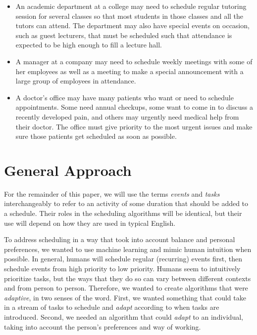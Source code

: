 \documentclass{article}
\newcommand{\todo}[1]{}
\begin{document}
\begin{itemize}
	\item 	
	 	An academic department at a college may need to schedule regular tutoring session for several classes so that most students in those classes and all the tutors can attend. The department may also have special events on occasion, such as guest lecturers, that must be scheduled such that attendance is expected to be high enough to fill a lecture hall.
	\item	
	 	A manager at a company may need to schedule weekly meetings with some of her employees as well as a meeting to make a special announcement with a large group of employees in attendance.
	\item
		A doctor's office may have many patients who want or need to schedule appointments. Some need annual checkups, some want to come in to discuss a recently developed pain, and others may urgently need medical help from their doctor. The office must give priority to the most urgent issues and make sure those patients get scheduled as soon as possible.
	\end{itemize}

\section{General Approach}
	For the remainder of this paper, we will use the terms \emph{events} and \emph{tasks} interchangeably to refer to an activity of some duration that should be added to a schedule.
	Their roles in the scheduling algorithms will be identical, but their use will depend on how they are used in typical English.

	To address scheduling in a way that took into account balance and personal preferences, we wanted to use machine learning and mimic human intuition when possible.
	In general, humans will schedule regular (recurring) events first, then schedule events from high priority to low priority.\todo{CITE THIS: psychology}
	Humans seem to intuitively prioritize tasks, but the ways that they do so can vary between different contexts and from person to person.
	Therefore, we wanted to create algorithms that were \emph{adaptive}, in two senses of the word.
	First, we wanted something that could take in a stream of tasks to schedule and \emph{adapt} according to when tasks are introduced.
	Second, we needed an algorithm that could \emph{adapt} to an individual, taking into account the person's preferences and way of working.
\end{document}
